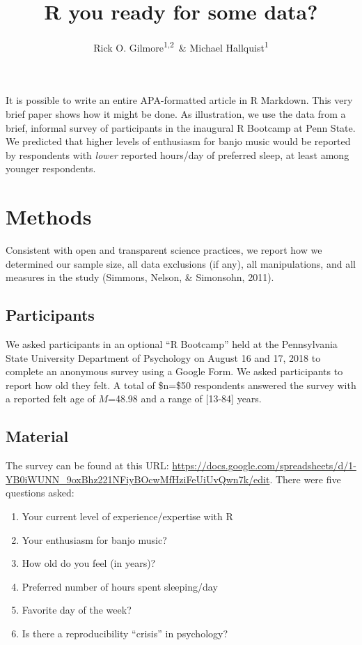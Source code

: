 \documentclass[english,man]{apa6}
\title{R you ready for some data?}
\author{Rick O. Gilmore\textsuperscript{1,2}~\& Michael Hallquist\textsuperscript{1}}
\affiliation{
    \vspace{0.5cm}
          \textsuperscript{1} The Pennsylvania State University\\
          \textsuperscript{2} Databrary.org  }
\providecommand{\tightlist}{%
  \setlength{\itemsep}{0pt}\setlength{\parskip}{0pt}}
\theoremstyle{definition}
\theoremstyle{definition}
\theoremstyle{definition}
\theoremstyle{remark}
\begin{document}
\maketitle

\setcounter{secnumdepth}{0}



It is possible to write an entire APA-formatted article in R Markdown.
This very brief paper shows how it might be done. As illustration, we
use the data from a brief, informal survey of participants in the
inaugural R Bootcamp at Penn State. We predicted that higher levels of
enthusiasm for banjo music would be reported by respondents with
\emph{lower} reported hours/day of preferred sleep, at least among
younger respondents.

\section{Methods}\label{methods}

Consistent with open and transparent science practices, we report how we
determined our sample size, all data exclusions (if any), all
manipulations, and all measures in the study (Simmons, Nelson, \&
Simonsohn, 2011).

\subsection{Participants}\label{participants}

We asked participants in an optional \enquote{R Bootcamp} held at the
Pennsylvania State University Department of Psychology on August 16 and
17, 2018 to complete an anonymous survey using a Google Form. We asked
participants to report how old they felt. A total of \$n=\$50
respondents answered the survey with a reported felt age of \(M\)=48.98
and a range of {[}13-84{]} years.

\subsection{Material}\label{material}

The survey can be found at this URL:
\url{https://docs.google.com/spreadsheets/d/1-YB0iWUNN_9oxBhz221NFiyBOcwMfHziFeUiUvQwn7k/edit}.
There were five questions asked:

\begin{enumerate}
\def\labelenumi{\arabic{enumi}.}
\tightlist
\item
  Your current level of experience/expertise with R
\item
  Your enthusiasm for banjo music?
\item
  How old do you feel (in years)?
\item
  Preferred number of hours spent sleeping/day
\item
  Favorite day of the week?
\item
  Is there a reproducibility \enquote{crisis} in psychology?
\end{enumerate}
\end{document}
